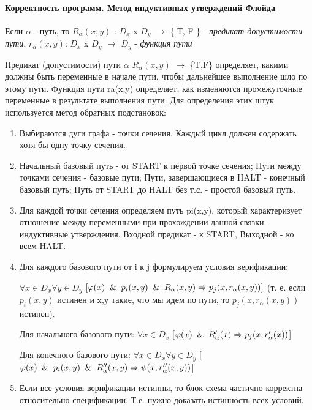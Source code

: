 \paragraph{Корректность программ. Метод индуктивных утверждений Флойда}

Если $\alpha$ - путь, то $R_{\alpha}(x,y)$ : $D_x$ x $D_y$ $\rightarrow$ \{ Т, F \} - \textit{предикат допустимости пути}. $r_{\alpha}(x,y)$: $D_x$ x $D_y$ $\rightarrow$ $D_y$ - \textit{функция пути}


Предикат (допустимости) пути $\alpha$ $R_{\alpha}(x,y)$ $\rightarrow$ \{T,F\} определяет, какими должны быть переменные в начале пути, чтобы дальнейшее выполнение шло по этому пути.
Функция пути ra(x,y) определяет, как изменяются промежуточные переменные в результате выполнения пути.
Для определения этих штук используется метод обратных подстановок:


\begin{enumerate}
    \item Выбираются дуги графа - точки сечения. Каждый цикл должен содержать хотя бы одну точку сечения.
    \item Начальный базовый путь - от START к первой точке сечения; Пути между точками сечения - базовые пути; Пути, завершающиеся в HALT - конечный базовый путь; Путь от START до HALT без т.с. - простой базовый путь.
    \item Для каждой точки сечения определяем путь pi(x,y), который характеризует отношение между переменными при прохождении данной связки - индуктивные утверждения. Входной предикат - к START, Выходной - ко всем HALT.
    \item Для каждого базового пути от i к j формулируем условия верификации: 
    
    $\forall x \in D_x \forall y \in D_y $  $[\varphi(x) \And p_i(x,y) \And R_{\alpha}(x,y) \Rightarrow p_j(x, r_{\alpha}(x,y)) ]$ (т. е. если $p_i(x,y)$ истинен и x,y такие, что мы идем по пути, то $p_j(x, r_{\alpha}(x,y))$ истинен). 
    
    Для начального базового пути: $\forall x \in D_x$ [$\varphi(x) \And R_{\alpha}'(x) \Rightarrow p_j(x, r_{\alpha}'(x))$]
    
    Для конечного базового пути: $\forall x  \in D_x \forall y \in D_y$ [$\varphi(x) \And p_i(x,y) \And R_{\alpha}''(x,y) \Rightarrow \psi(x, r_{\alpha}''(x,y))$]
    
    \item Если все условия верификации истинны, то блок-схема частично корректна относительно спецификации. Т.е. нужно доказать истинность всех условий.

\end{enumerate}
 

